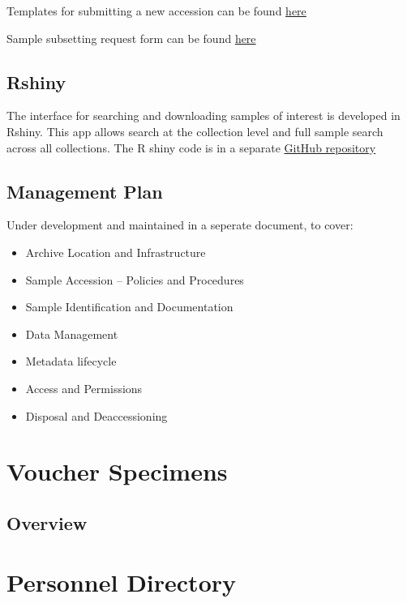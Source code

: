 \documentclass[
  letterpaper,
  DIV=11,
  numbers=noendperiod]{scrreprt}
\providecommand{\tightlist}{%
  \setlength{\itemsep}{0pt}\setlength{\parskip}{0pt}}\usepackage{longtable,booktabs,array}
\begin{document}
Templates for submitting a new accession can be found \href{link}{here}

Sample subsetting request form can be found
\href{subsampling_request.pdf}{here}

\section{Rshiny}\label{rshiny}

The interface for searching and downloading samples of interest is
developed in Rshiny. This app allows search at the collection level and
full sample search across all collections. The R shiny code is in a
separate \href{link}{GitHub repository}

\section{Management Plan}\label{management-plan}

Under development and maintained in a seperate document, to cover:

\begin{itemize}
\tightlist
\item
  Archive Location and Infrastructure
\item
  Sample Accession -- Policies and Procedures
\item
  Sample Identification and Documentation
\item
  Data Management
\item
  Metadata lifecycle
\item
  Access and Permissions
\item
  Disposal and Deaccessioning
\end{itemize}


\chapter{Voucher Specimens}\label{voucher-specimens}

\section{Overview}\label{overview-5}


\chapter{Personnel Directory}\label{personnel-directory}
\end{document}
